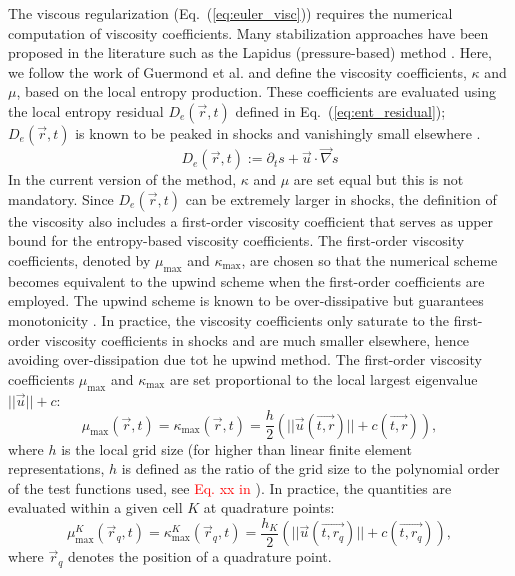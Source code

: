 \documentclass[preprint,10pt]{elsarticle}
\newcommand{\grad}{\vec{\nabla}}
\newcommand{\eqt}[1]{Eq.~(\ref{#1})}                     %
\newcommand{\tcr}[1]{\textcolor{red}{#1}}
\begin{document}
The viscous regularization (\eqt{eq:euler_visc}) requires the numerical computation of viscosity coefficients. Many stabilization approaches have been proposed in the literature such as the Lapidus (pressure-based) method \cite{Lapidus_book, Lapidus_paper}. Here, we follow the work of Guermond et al. and define the viscosity coefficients, $\kappa$ and $\mu$, based on the local entropy production. These coefficients are evaluated using the local entropy residual $D_e(\vec{r},t)$ defined in \eqt{eq:ent_residual}; $D_e(\vec{r},t)$ is known to be peaked in shocks and vanishingly small elsewhere \cite{Toro}. 
%
\begin{equation}
\label{eq:ent_residual}
D_e(\vec{r}, t) := \partial_t s + \vec{u} \cdot \grad s
\end{equation}
%
In the current version of the method, $\kappa$ and $\mu$ are set equal but this is not mandatory. Since $D_e(\vec{r},t)$ can be extremely larger in shocks, the definition of the viscosity also includes a first-order viscosity coefficient that serves as upper bound for the entropy-based viscosity coefficients. The first-order viscosity coefficients, denoted by $\mu_{\max}$ and $\kappa_{\max}$, are chosen so that the numerical scheme becomes equivalent to the upwind scheme when the first-order coefficients are employed. The upwind scheme is known to be over-dissipative but guarantees monotonicity \cite{Toro}. In practice, the viscosity coefficients only saturate to the first-order viscosity coefficients in shocks and are much smaller elsewhere, hence avoiding over-dissipation due tot he upwind method.  The first-order viscosity coefficients $\mu_{\max}$ and $\kappa_{\max}$ are set proportional to the local largest eigenvalue $|| \vec{u} || + c $:
%
\begin{equation}
\label{eq:fo}
\mu_{\max}(\vec{r}, t) = \kappa_{\max}(\vec{r}, t) = \frac{h}{2} \left( || \vec{u}(\vec{t,r}) || + c(\vec{t,r}) \right),
\end{equation}
%
where $h$ is the local grid size (for higher than linear finite element representations, $h$ is defined as the ratio of the grid size to the polynomial order of the test functions used, see \tcr{Eq. xx in \cite{jlg1}}). In practice, the quantities are evaluated within a given cell $K$ at quadrature points:
%
\begin{equation}
\label{eq:fo_quad}
\mu^K_{\max}(\vec{r}_q, t) = \kappa^K_{\max}(\vec{r}_q, t) = \frac{h_K}{2} \left( || \vec{u}(\vec{t,r_q}) || + c(\vec{t,r_q}) \right),
\end{equation}
%
where $\vec{r}_q$ denotes the position of a quadrature point.\\
\end{document}
